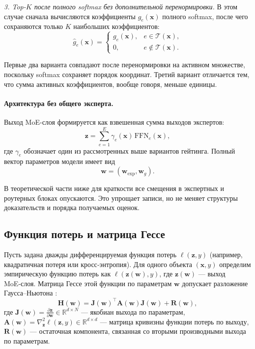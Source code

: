 \documentclass[11pt]{extarticle}
\theoremstyle{definition}
\theoremstyle{plain}
\theoremstyle{remark}
\begin{document}
\textit{3. Top-$K$ после полного softmax без дополнительной перенормировки.}
В этом случае сначала вычисляются коэффициенты $g_e(\mathbf x)$ полного softmax, после чего сохраняются только $K$ наибольших коэффициентов:
\begin{equation*}
    \hat g_e(\mathbf x)=
    \begin{cases}
        g_e(\mathbf x), & e\in\mathcal T(\mathbf x),\\
        0, & e\notin\mathcal T(\mathbf x).
    \end{cases}
\end{equation*}

Первые два варианта совпадают после перенормировки на активном множестве, поскольку softmax сохраняет порядок координат. Третий вариант отличается тем, что сумма активных коэффициентов, вообще говоря, меньше единицы.

\paragraph{Архитектура без общего эксперта.}
Выход MoE-слоя формируется как взвешенная сумма выходов экспертов:
\begin{equation*}
    \mathbf z
    =
    \sum\limits_{e=1}^{E}\gamma_e(\mathbf x)\,\mathrm{FFN}_e(\mathbf x),
\end{equation*}
где $\gamma_e$ обозначает один из рассмотренных выше вариантов гейтинга. Полный вектор параметров модели имеет вид
\begin{equation*}
    \mathbf w=(\mathbf w_{\text{exp}},\mathbf w_g).
\end{equation*}

В теоретической части ниже для краткости все смещения в экспертных и роутерных блоках опускаются. Это упрощает записи, но не меняет структуры доказательств и порядка получаемых оценок.

\subsection{Функция потерь и матрица Гессе}

Пусть задана дважды дифференцируемая функция потерь \(\ell(\mathbf{z}, y)\) (например, квадратичная потеря или кросс‑энтропия). Для одного объекта \((\mathbf{x}, y)\) определим эмпирическую функцию потерь как \(\ell(\mathbf{z}(\mathbf{w}), y)\), где \(\mathbf{z}(\mathbf{w})\) — выход MoE‑слоя. Матрица Гессе этой функции по параметрам \(\mathbf{w}\) допускает разложение Гаусса–Ньютона \cite{Meshkov2024}:
\[
\mathbf{H}(\mathbf{w}) = \mathbf{J}(\mathbf{w})^\top \mathbf{A}(\mathbf{w}) \mathbf{J}(\mathbf{w}) + \mathbf{R}(\mathbf{w}),
\]
где  
\(\mathbf{J}(\mathbf{w}) = \frac{\partial \mathbf{z}}{\partial \mathbf{w}} \in \mathbb{R}^{d \times N}\) — якобиан выхода по параметрам,  
\(\mathbf{A}(\mathbf{w}) = \nabla_{\mathbf{z}}^2 \ell(\mathbf{z}, y) \in \mathbb{R}^{d \times d}\) — матрица кривизны функции потерь по выходу,  
\(\mathbf{R}(\mathbf{w})\) — остаточная компонента, связанная со вторыми производными выхода по параметрам.
\end{document}
